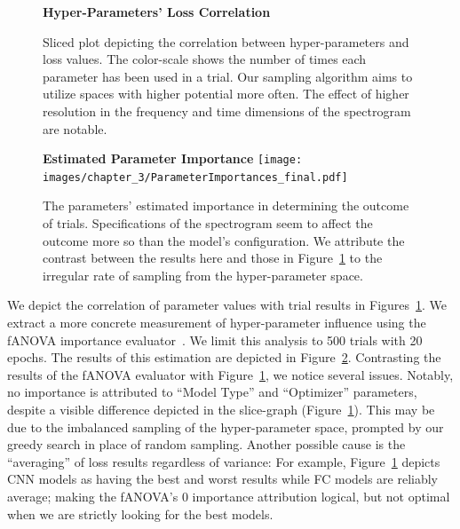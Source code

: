 \documentclass[\main/thesis.tex]{subfiles}
\begin{document}
\begin{figure}[]
\begin{center}
    \textbf{Hyper-Parameters' Loss Correlation}
      \caption{Sliced plot depicting the correlation between hyper-parameters and loss values. The color-scale shows the number of times each parameter has been used in a trial. Our sampling algorithm aims to utilize spaces with higher potential more often. The effect of higher resolution in the frequency and time dimensions of the spectrogram are notable.}
    \label{fig:slicegraph}
    \end{center}

\end{figure}
   

\begin{figure}[]
\centering
\textbf{Estimated Parameter Importance}
\texttt{[image: images/chapter\_3/ParameterImportances\_final.pdf]}
\caption{The parameters' estimated importance in determining the outcome of trials. Specifications of the spectrogram seem to affect the outcome more so than the model's configuration. We attribute the contrast between the results here and those in Figure~\ref{fig:slicegraph} to the irregular rate of sampling from the hyper-parameter space.}
\label{chap3:param_importance}
\end{figure}

We depict the correlation of parameter values with trial results in Figures~\ref{fig:slicegraph}. We extract a more concrete measurement of hyper-parameter influence using the fANOVA importance evaluator~\cite{hutter2014efficient}. We limit this analysis to 500 trials with 20 epochs. The results of this estimation are depicted in Figure~\ref{chap3:param_importance}. Contrasting the results of the fANOVA evaluator with Figure~\ref{fig:slicegraph}, we notice several issues. Notably, no importance is attributed to \enquote{Model Type} and \enquote{Optimizer} parameters, despite a visible difference depicted in the slice-graph (Figure~\ref{fig:slicegraph}). This may be due to the imbalanced sampling of the hyper-parameter space, prompted by our greedy search in place of random sampling. Another possible cause is the \enquote{averaging} of loss results regardless of variance: For example, Figure~\ref{fig:slicegraph} depicts CNN models as having the best and worst results while FC models are reliably average; making the fANOVA's 0 importance attribution logical, but not optimal when we are strictly looking for the best models. 
\end{document}
